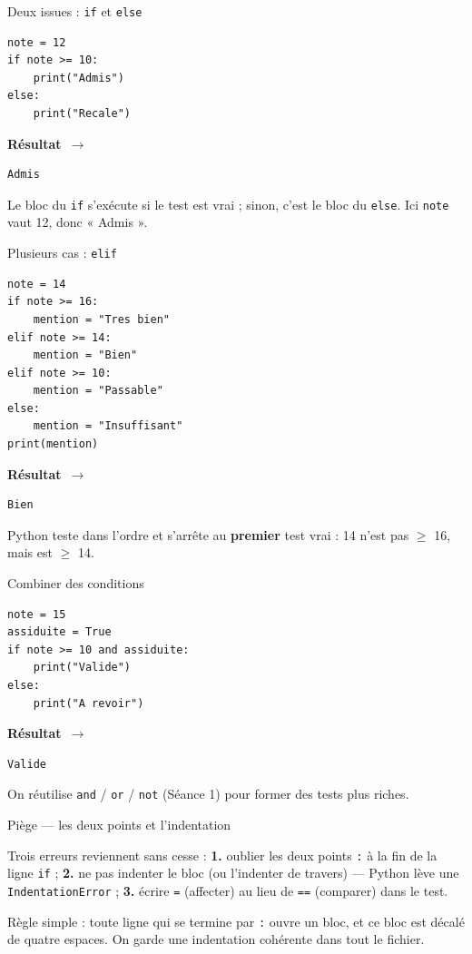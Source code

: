 \documentclass[aspectratio=169,11pt]{beamer}
\newcommand{\resultat}{{\scriptsize\textbf{R\'esultat}~$\rightarrow$}\par\vspace{1pt}}
\begin{document}
\begin{frame}[fragile]{Deux issues : \texttt{if} et \texttt{else}}
\begin{lstlisting}
note = 12
if note >= 10:
    print("Admis")
else:
    print("Recale")
\end{lstlisting}
\resultat
\begin{lstlisting}[style=out]
Admis
\end{lstlisting}
{\small Le bloc du \texttt{if} s'exécute si le test est vrai ; sinon, c'est le bloc du \texttt{else}. Ici \texttt{note} vaut 12, donc « Admis ».}
\end{frame}

\begin{frame}[fragile]{Plusieurs cas : \texttt{elif}}
\begin{lstlisting}
note = 14
if note >= 16:
    mention = "Tres bien"
elif note >= 14:
    mention = "Bien"
elif note >= 10:
    mention = "Passable"
else:
    mention = "Insuffisant"
print(mention)
\end{lstlisting}
\resultat
\begin{lstlisting}[style=out]
Bien
\end{lstlisting}
{\small Python teste dans l'ordre et s'arrête au \textbf{premier} test vrai : 14 n'est pas $\geq$ 16, mais est $\geq$ 14.}
\end{frame}

\begin{frame}[fragile]{Combiner des conditions}
\begin{lstlisting}
note = 15
assiduite = True
if note >= 10 and assiduite:
    print("Valide")
else:
    print("A revoir")
\end{lstlisting}
\resultat
\begin{lstlisting}[style=out]
Valide
\end{lstlisting}
{\small On réutilise \texttt{and} / \texttt{or} / \texttt{not} (Séance 1) pour former des tests plus riches.}
\end{frame}

\begin{frame}{Piège — les deux points et l'indentation}
\begin{ucadpiege}
{\small Trois erreurs reviennent sans cesse : \textbf{1.} oublier les deux points \texttt{:} à la fin de la ligne \texttt{if} ; \textbf{2.} ne pas indenter le bloc (ou l'indenter de travers) — Python lève une \texttt{IndentationError} ; \textbf{3.} écrire \texttt{=} (affecter) au lieu de \texttt{==} (comparer) dans le test.}
\end{ucadpiege}
{\small Règle simple : toute ligne qui se termine par \texttt{:} ouvre un bloc, et ce bloc est décalé de quatre espaces. On garde une indentation cohérente dans tout le fichier.}
\end{frame}
\end{document}
